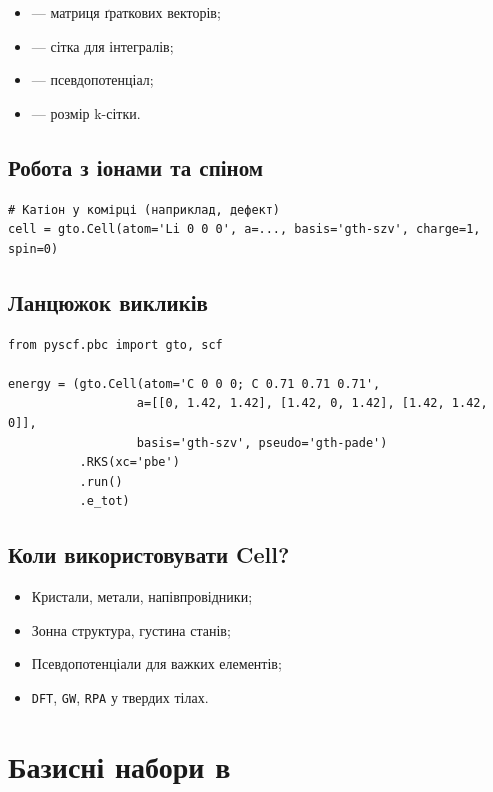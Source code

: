 \begin{itemize}
	\item {} --- матриця ґраткових векторів;
	\item {} --- сітка для інтегралів;
	\item {} --- псевдопотенціал;
	\item {} --- розмір k-сітки.
\end{itemize}

\subsection{Робота з іонами та спіном}

\begin{verbatim}
# Катіон у комірці (наприклад, дефект)
cell = gto.Cell(atom='Li 0 0 0', a=..., basis='gth-szv', charge=1, spin=0)
\end{verbatim}

\subsection{Ланцюжок викликів}

\begin{verbatim}
from pyscf.pbc import gto, scf

energy = (gto.Cell(atom='C 0 0 0; C 0.71 0.71 0.71',
                  a=[[0, 1.42, 1.42], [1.42, 0, 1.42], [1.42, 1.42, 0]],
                  basis='gth-szv', pseudo='gth-pade')
          .RKS(xc='pbe')
          .run()
          .e_tot)
\end{verbatim}

\subsection{Коли використовувати Cell?}

\begin{itemize}
	\item Кристали, метали, напівпровідники;
	\item Зонна структура, густина станів;
	\item Псевдопотенціали для важких елементів;
	\item \texttt{DFT}, \texttt{GW}, \texttt{RPA} у твердих тілах.
\end{itemize}

\section{Базисні набори в \PySCF}

